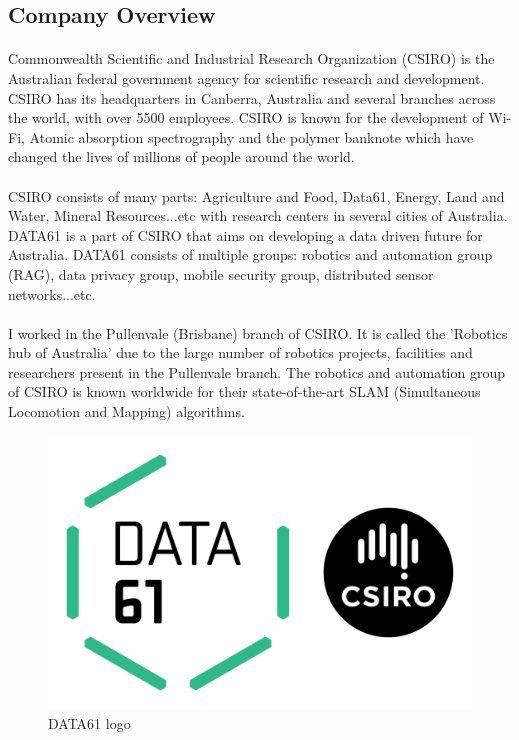 
\subsection{Company Overview}

\paragraph{}
Commonwealth Scientific and Industrial Research Organization (CSIRO) is the Australian federal government agency for scientific research and development.  CSIRO has its headquarters in Canberra, Australia and several branches across the world, with over 5500 employees. CSIRO is known for the development of Wi-Fi, Atomic absorption spectrography and the polymer banknote which have changed the lives of millions of people around the world.

\paragraph{}
CSIRO consists of many parts: Agriculture and Food, Data61, Energy, Land and Water, Mineral Resources...etc with research centers in several cities of Australia. DATA61 is a part of CSIRO that aims on developing a data driven future for Australia. DATA61 consists of multiple groups: robotics and automation group (RAG), data privacy group, mobile security group, distributed sensor networks...etc. 

\paragraph{}
I worked in the Pullenvale (Brisbane) branch of CSIRO. It is called the 'Robotics hub of Australia' due to the large number of robotics projects, facilities and researchers present in the Pullenvale branch. The robotics and automation group of CSIRO is known worldwide for their state-of-the-art SLAM (Simultaneous Locomotion and Mapping) algorithms.

\begin{figure}[h]
\centering
\includegraphics[trim=0cm 0cm 0cm 0cm, clip=true,scale=1]{figures/data61_logo.png}
\caption{DATA61 logo\label{Fig:data61}}\vspace{-4mm}
\end{figure}


